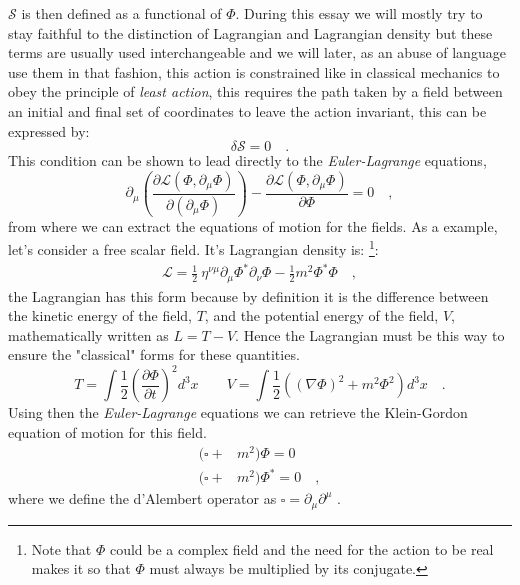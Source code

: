 \documentclass[12pt]{article}
\begin{document}
$\mathcal{S} $ is then defined as a functional of $\Phi$. During this essay we will mostly try to stay faithful to the distinction of Lagrangian and Lagrangian density but these terms are usually used interchangeable and we will later, as an abuse of language use them in that fashion,   
this action is constrained like in classical mechanics to obey the principle of \textit{least action}, this requires the path taken by a field between an initial and final set of coordinates to leave the action invariant, this can be expressed by:
%
\begin{equation}
\delta \mathcal{S} = 0 \quad .
\end{equation} 
%
This condition can be shown to lead directly to the \textit{Euler-Lagrange} equations,  
%
\begin{equation}
 \partial_\mu \left( \frac{\partial \mathcal{L}(\Phi , \partial_\mu \Phi )}{\partial(\partial_\mu \Phi)} \right) - \frac {\partial \mathcal{L}(\Phi , \partial_\mu \Phi )}{\partial \Phi}  = 0 \quad , 
\end{equation}
%
from where we can extract the equations of motion for the fields.
%
As a example, let's consider a free scalar field. It's Lagrangian density is: \footnote{Note that $\Phi$ could be a complex field and the need for the action to be real makes it so that $\Phi$ must always be multiplied by its conjugate.}: 
%
\begin{align}
\mathcal{L} =\frac{1}{2} \ \eta^{\nu \! \mu} \partial_\mu  \Phi^*  \partial_\nu   \Phi  -  \frac{1}{2}    m^2 \Phi^* \Phi \quad , 
\end{align}
%
the Lagrangian has this form because by definition it is the difference between the kinetic energy of the field, $T$, and the potential energy of the field, $V$, mathematically written as $L=T-V$.
%
Hence the Lagrangian must be this way to ensure the "classical" forms for these quantities.
%
\begin{equation}
T= \int \frac{1}{2} \left( \frac{\partial \Phi}{\partial t} \right)^2 d^3 x \qquad V=\int \frac{1}{2} \left( (\nabla \Phi)^2 + m^2 \Phi^2  \right) d^3 x \quad .
\end{equation}
%
Using then the \textit{Euler-Lagrange} equations we can retrieve the Klein-Gordon equation of motion for this field. 
%
\begin{align}
 (\square + & m^2 )\Phi  =0 \nonumber  \\
 (\square + & m^2 )\Phi^*  =0  \quad , 
\end{align}
%
where we define the d'Alembert operator as $\square=\partial_\mu \partial^\mu$ .
\end{document}
